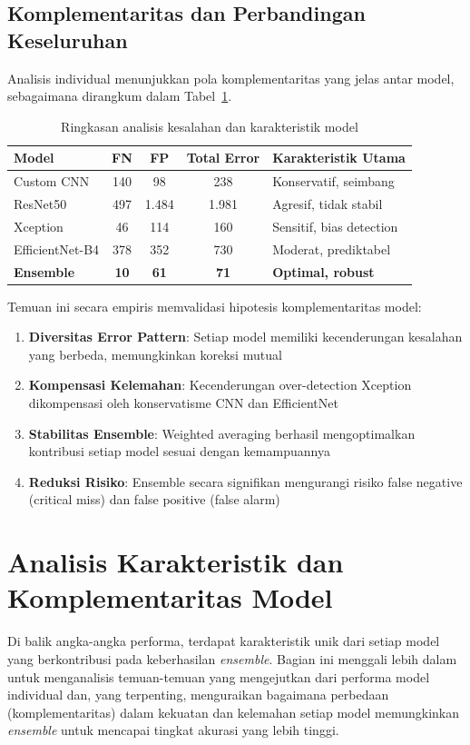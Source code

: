 \subsection{Komplementaritas dan Perbandingan Keseluruhan}

Analisis individual menunjukkan pola komplementaritas yang jelas antar model, sebagaimana dirangkum dalam Tabel~\ref{tab:error_analysis_summary}.

\begin{table}[H]
\centering
\caption{Ringkasan analisis kesalahan dan karakteristik model}
\label{tab:error_analysis_summary}
\begin{tabular}{|l|c|c|c|l|}
\hline
\textbf{Model} & \textbf{FN} & \textbf{FP} & \textbf{Total Error} & \textbf{Karakteristik Utama} \\
\hline
Custom CNN & 140 & 98 & 238 & Konservatif, seimbang \\
ResNet50 & 497 & 1.484 & 1.981 & Agresif, tidak stabil \\
Xception & 46 & 114 & 160 & Sensitif, bias detection \\
EfficientNet-B4 & 378 & 352 & 730 & Moderat, prediktabel \\
\hline
\textbf{Ensemble} & \textbf{10} & \textbf{61} & \textbf{71} & \textbf{Optimal, robust} \\
\hline
\end{tabular}
\end{table}

Temuan ini secara empiris memvalidasi hipotesis komplementaritas model:
\begin{enumerate}
    \item \textbf{Diversitas Error Pattern}: Setiap model memiliki kecenderungan kesalahan yang berbeda, memungkinkan koreksi mutual
    \item \textbf{Kompensasi Kelemahan}: Kecenderungan over-detection Xception dikompensasi oleh konservatisme CNN dan EfficientNet
    \item \textbf{Stabilitas Ensemble}: Weighted averaging berhasil mengoptimalkan kontribusi setiap model sesuai dengan kemampuannya
    \item \textbf{Reduksi Risiko}: Ensemble secara signifikan mengurangi risiko false negative (critical miss) dan false positive (false alarm)
\end{enumerate}


\section{Analisis Karakteristik dan Komplementaritas Model}
Di balik angka-angka performa, terdapat karakteristik unik dari setiap model yang berkontribusi pada keberhasilan \textit{ensemble}. Bagian ini menggali lebih dalam untuk menganalisis temuan-temuan yang mengejutkan dari performa model individual dan, yang terpenting, menguraikan bagaimana perbedaan (komplementaritas) dalam kekuatan dan kelemahan setiap model memungkinkan \textit{ensemble} untuk mencapai tingkat akurasi yang lebih tinggi.

